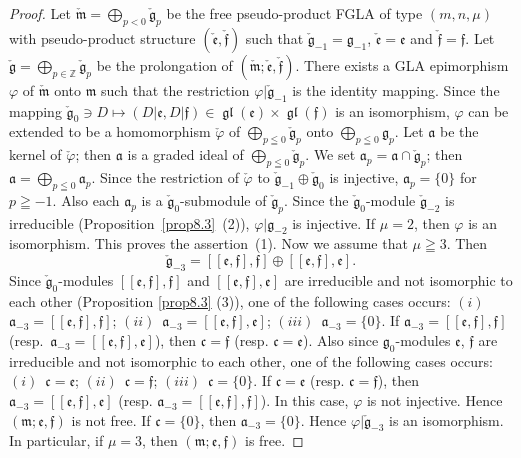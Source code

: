 \documentclass[pdftex]{sigma}
\numberwithin{equation}{section}
\numberwithin{theorem}{section}
\numberwithin{proposition}{section}
\numberwithin{lemma}{section}
\numberwithin{corollary}{section}
\numberwithin{definition}{section}
\numberwithin{example}{section}
\numberwithin{remark}{section}
\numberwithin{note}{section}
\newcommand{\gl}{\operatorname{\mathfrak{gl}}}
\begin{document}
\begin{proof}
Let
$\check{\mathfrak m}=\bigoplus_{p<0}\limits\check{\mathfrak g}_p$
be the free pseudo-product FGLA of type $(m,n,\mu)$
with pseudo-product structure
$(\check{\mathfrak e},\check{\mathfrak f})$ such that
$\check{\mathfrak g}_{-1}=\mathfrak g_{-1}$,
$\check{\mathfrak e}=\mathfrak e$ and $\check{\mathfrak f}=\mathfrak f$.
Let $\check{\mathfrak g}=\bigoplus_{p\in\mathbb Z}\limits\check{\mathfrak g}_p$  be the prolongation of $(\check{\mathfrak m};\check{\mathfrak e},\check{\mathfrak f})$.
There exists a GLA epimorphism $\varphi$
of $\check{\mathfrak m}$ onto $\mathfrak m$ such that the restriction
$\varphi|\check{\mathfrak g}_{-1}$ is the identity mapping.
Since the mapping
$\check{\mathfrak g}_0\ni D\mapsto
(D|\mathfrak e,D|\mathfrak f)\in\gl(\mathfrak e)\times\gl(\mathfrak f)$
is an isomorphism,
$\varphi$ can be extended to be a homomorphism $\check{\varphi}$
of $\bigoplus\limits_{p\leqq0}\check{\mathfrak g}_{p}$ onto
$\bigoplus\limits_{p\leqq0}\mathfrak g_p$.
Let $\mathfrak a$ be the kernel of $\check{\varphi}$;
then $\mathfrak a$ is a graded ideal of
$\bigoplus\limits_{p\leqq0}\check{\mathfrak g}_{p}$.
We set $\mathfrak a_p
=\mathfrak a\cap \check{\mathfrak g}_{p}$; then
$\mathfrak a=\bigoplus\limits_{p\leqq 0}\mathfrak a_p$.
Since the restriction of $\check{\varphi}$ to
$\check{\mathfrak g}_{-1}\oplus \check{\mathfrak g}_0$ is injective,
$\mathfrak a_p=\{0\}$ for $p\geqq-1$. Also
each $\mathfrak a_p$ is a $\check{\mathfrak g}_0$-submodule of
$\check{\mathfrak g}_p$.
Since the $\check{\mathfrak g}_0$-module
$\check{\mathfrak g}_{-2}$ is irreducible (Proposition~\ref{prop8.3}~(2)),
$\varphi|\mathfrak g_{-2}$ is injective.
If $\mu=2$, then $\varphi$ is an isomorphism. This proves the assertion~(1).
Now we assume that $\mu\geqq3$. Then
\[
\check{\mathfrak g}_{-3}=[[\mathfrak e,\mathfrak f],\mathfrak f]\oplus
[[\mathfrak e,\mathfrak f],\mathfrak e].
\]
Since $\check{\mathfrak g}_0$-modules
$[[\mathfrak e,\mathfrak f],\mathfrak f]$ and
$[[\mathfrak e,\mathfrak f],\mathfrak e]$ are irreducible and not isomorphic
to each other (Proposition \ref{prop8.3} (3)),
one of the following cases occurs:
$(i)$~$\mathfrak a_{-3}=[[\mathfrak e,\mathfrak f],\mathfrak f]$;
$(ii)$~$\mathfrak a_{-3}=[[\mathfrak e,\mathfrak f],\mathfrak e]$;
$(iii)$~$\mathfrak a_{-3}=\{0\}$.
If $\mathfrak a_{-3}=[[\mathfrak e,\mathfrak f],\mathfrak f]$ (resp.\
$\mathfrak a_{-3}=[[\mathfrak e,\mathfrak f],\mathfrak e]$), then
$\mathfrak c=\mathfrak f$
(resp. $\mathfrak c=\mathfrak e$).
Also
since $\mathfrak g_0$-modules
$\mathfrak e$,
$\mathfrak f$ are irreducible and not isomorphic to each other,
one of the following cases occurs:
$(i)$~$\mathfrak c=\mathfrak e$;
$(ii)$~$\mathfrak c=\mathfrak f$;
$(iii)$~$\mathfrak c=\{0\}$.
If $\mathfrak c=\mathfrak e$
(resp. $\mathfrak c=\mathfrak f$),
then $\mathfrak a_{-3}=[[\mathfrak e,\mathfrak f],\mathfrak e]$
(resp. $\mathfrak a_{-3}=[[\mathfrak e,\mathfrak f],\mathfrak f]$).
In this case, $\varphi$ is not injective.
Hence $(\mathfrak m;\mathfrak e,\mathfrak f)$ is not free.
If $\mathfrak c=\{0\}$,
then $\mathfrak a_{-3}=\{0\}$.
Hence $\varphi|\check{\mathfrak g}_{-3}$ is an isomorphism.
In particular, if $\mu=3$, then
$(\mathfrak m;\mathfrak e,\mathfrak f)$ is free.
\end{proof}
\end{document}
